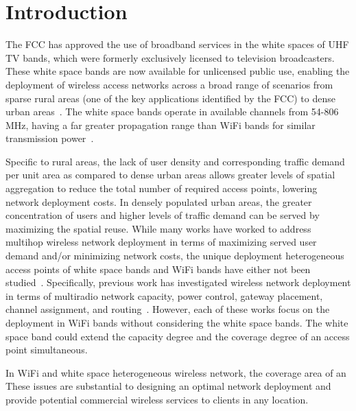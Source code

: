 \section{Introduction}
\label{sec:introduction}



The FCC has approved the use of broadband services in the white spaces of 
UHF TV bands, which were formerly exclusively licensed to television broadcasters.
These white space bands are now available for unlicensed public use, enabling the
deployment of wireless access networks across a broad range of scenarios from 
sparse rural areas (one of the key applications identified by the FCC) to dense urban 
areas~\cite{carlson}. The white space bands operate in available channels from 
54-806 MHz, having a far greater propagation range than WiFi bands for similar
transmission power~\cite{balanis2012antenna}. 

Specific to rural areas, the lack of user density and corresponding traffic
demand per unit area as compared to dense urban areas allows greater levels of
spatial aggregation to reduce the total number of required access points, lowering
network deployment costs. In densely populated urban areas, the greater concentration
of users and higher levels of traffic demand can be served by maximizing the spatial
reuse. While many works have worked to address multihop wireless network deployment
in terms of maximizing served user demand and/or minimizing network costs,
the unique deployment heterogeneous access points of white space bands and 
WiFi bands have either not been studied~\cite{si2010overview}. 
Specifically, previous work has investigated wireless network deployment in terms of multiradio
network capacity, power control, gateway placement, channel assignment, 
and routing~\cite{kodialam2005characterizing,he2008optimizing,marina2010topology}.
However, each of these works focus on the deployment in WiFi bands without
considering the white space bands. The white space band could extend the capacity 
degree and the coverage degree of an access point simultaneous. 





In WiFi and white 
space heterogeneous wireless network, the coverage area of an These issues are substantial to 
designing an optimal network deployment and provide potential commercial 
wireless services to clients in any location.










